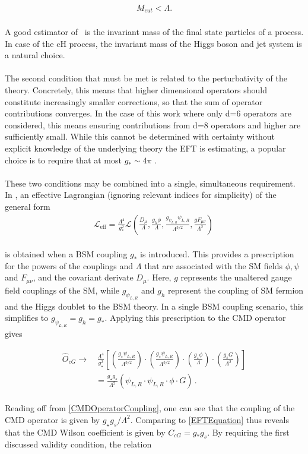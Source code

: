 \begin{align}
    M_{cut} < \Lambda . 
\end{align}
\\
A good estimator of \mcut \, is the invariant mass of the final state particles of a process. In case of the cH process, the invariant mass of the Higgs boson and jet system is a natural choice.\\
\\
The second condition that must be met is related to the perturbativity of the theory. Concretely, this means that higher dimensional operators should constitute increasingly smaller corrections, so that the sum of operator contributions converges. In the case of this work where only d=6 operators are considered, this means ensuring contributions from d=8 operators and higher are sufficiently small. While this cannot be determined with certainty without explicit knowledge of the underlying theory the EFT is estimating, a popular choice is to require that at most $g_{*} \sim 4\pi$ \cite{Elias_Mir__2013}. \\
\\
These two conditions may be combined into a single, simultaneous requirement. In \cite{Elias_Mir__2013}, an effective Lagrangian (ignoring relevant indices for simplicity) of the general form 
\begin{align}
\mathcal{L}_{\mathrm{eff}}=\frac{\Lambda^4}{g_*^2} \mathcal{L}\left(\frac{D_\mu}{\Lambda}, \frac{g_h \phi}{\Lambda}, \frac{g_{\psi_{L, R}} \psi_{L, R}}{\Lambda^{3 / 2}}, \frac{g F_{\mu \nu}}{\Lambda^2}\right)\,
\end{align}
\\
is obtained when a BSM coupling $g_{*}$ is introduced. This provides a prescription for the powers of the couplings and $\Lambda$ that are associated with the SM fields $\phi, \psi$ and $F_{\mu \nu}$, and the covariant derivate ${D_\mu}$. Here, $g$ represents the unaltered gauge field couplings of the SM, while $g_{\psi_{L, R}}$ and $g_h$ represent the coupling of SM fermion and the Higgs doublet to the BSM theory. In a single BSM coupling scenario, this simplifies to $g_{\psi_{L, R}} = g_h = g_*$. Applying this prescription to the CMD operator gives 

\begin{align}
    \hat{O}_{cG} \longrightarrow&
    \,\frac{\Lambda^4}{g^2_\star} \left[\left(\frac{g_\star \psi_{L,R}}{\Lambda^{3/2}}\right) \cdot \left(\frac{g_\star \psi_{L,R}}{\Lambda^{3/2}}\right) \cdot \left(\frac{g_\star \phi}{\Lambda}\right) \cdot \left(\frac{g_s G}{\Lambda^2}\right)\right] \\
    &= \frac{g_\star g_s}{\Lambda^2} \left( \psi_{L,R} \cdot \psi_{L,R}\cdot \phi \cdot G \right)\,. \label{CMDOperatorCoupling}
\end{align}
\\
Reading off from \autoref{CMDOperatorCoupling}, one can see that the coupling of the CMD operator is given by $g_\star g_s/\Lambda^2$. Comparing to \autoref{EFTEquation} thus reveals that the CMD Wilson coefficient is given by $C_{cG} = g_* g_s$. By requiring the first discussed validity condition, the relation 

